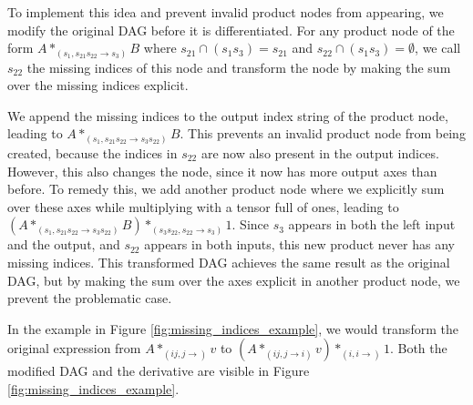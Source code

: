 \documentclass[12pt, a4paper]{report} %
\begin{document}
To implement this idea and prevent invalid product nodes from appearing, we modify the original DAG before it is differentiated.
For any product node of the form $A *_{(s_1, s_{21} s_{22} \rightarrow s_3)} B$ where $s_{21} \cap (s_1 s_3) = s_{21}$ and $s_{22} \cap (s_1 s_3) = \emptyset$, we call $s_{22}$ the missing indices of this node and transform the node by making the sum over the missing indices explicit.

We append the missing indices to the output index string of the product node, leading to $A *_{(s_1, s_{21} s_{22} \rightarrow s_3 s_{22})} B$.
This prevents an invalid product node from being created, because the indices in $s_{22}$ are now also present in the output indices.
However, this also changes the node, since it now has more output axes than before.
To remedy this, we add another product node where we explicitly sum over these axes while multiplying with a tensor full of ones, leading to $(A *_{(s_1, s_{21} s_{22} \rightarrow s_3 s_{22})} B) *_{(s_3 s_{22}, s_{22} \rightarrow s_3)} 1$.
Since $s_3$ appears in both the left input and the output, and $s_{22}$ appears in both inputs, this new product never has any missing indices.
This transformed DAG achieves the same result as the original DAG, but by making the sum over the axes explicit in another product node, we prevent the problematic case.

In the example in Figure \ref{fig:missing_indices_example}, we would transform the original expression from $A *_{(ij,j \rightarrow )} v$ to $(A *_{(ij,j \rightarrow i)} v) *_{(i,i \rightarrow)} 1$.
Both the modified DAG and the derivative are visible in Figure \ref{fig:missing_indices_example}.
\end{document}
